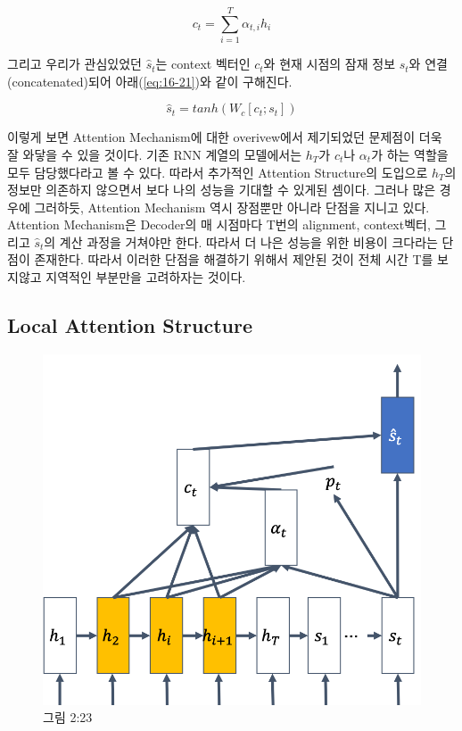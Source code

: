 \documentclass[draft=false]{oblivoir}
\begin{document}
\begin{equation}
	c_t = \sum_{i=1}^{T}\alpha_{t,i}h_i
	\label{eq:16-20}
\end{equation}

그리고 우리가 관심있었던 $\hat{s}_t$는 context 벡터인 $c_t$와 현재 시점의 잠재 정보 $s_t$와 연결(concatenated)되어 아래(\ref{eq:16-21})와 같이 구해진다. 

\begin{equation}
	\hat{s}_t = tanh(W_c[c_t; s_t])
	\label{eq:16-21}
\end{equation}

이렇게 보면 Attention Mechanism에 대한 overivew에서 제기되었던 문제점이 더욱 잘 와닿을 수 있을 것이다. 기존 RNN 계열의 모델에서는  $h_T$가 $c_t$나 $\alpha_t$가 하는 역할을 모두 담당했다라고 볼 수 있다. 따라서 추가적인 Attention Structure의 도입으로 $h_T$의 정보만 의존하지 않으면서 보다 나의 성능을 기대할 수 있게된 셈이다. 그러나 많은 경우에 그러하듯, Attention Mechanism 역시 장점뿐만 아니라 단점을 지니고 있다. Attention Mechanism은 Decoder의 매 시점마다 T번의 alignment, context벡터, 그리고 $\hat{s}_t$의 계산 과정을 거쳐야만 한다. 따라서 더 나은 성능을 위한 비용이 크다라는 단점이 존재한다. 따라서 이러한 단점을 해결하기 위해서 제안된 것이 전체 시간 T를 보지않고 지역적인 부분만을 고려하자는 것이다. 

\subsection{Local Attention Structure}

\begin{figure}[ht] \centering 
  \includegraphics[scale=0.5]{fig22.png} 
  \caption{그림 2:23}
  \label{fig:16-22}
\end{figure}
\end{document}
